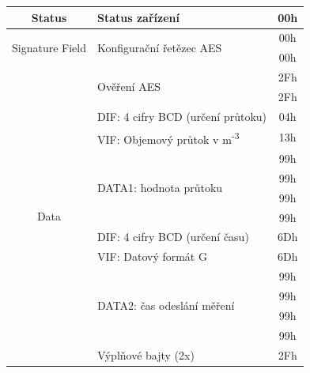 \begin{table}[!ht]
{\begin{tabular}{|c|l|c|}
Status             & Status zařízení                                & 00h              \\ \hline
\multirow{2}{*}{Signature Field} & \multirow{2}{*}{Konfigurační řetězec AES} & 00h              \\ \cline{3-3}
									&                        													& 00h              \\ \hline
\multirow{15}{*}{Data} 						   & \multirow{2}{*}{Ověření AES}                  & 2Fh              \\ \cline{3-3}
						   &                                     						& 2Fh              \\ \cline{2-3}
               & DIF: 4 cifry BCD (určení průtoku)      & 04h              \\ \cline{2-3}
               & VIF: Objemový průtok v m\textsuperscript{-3} & 13h         \\ \cline{2-3}
              & \multirow{4}{*}{DATA1: hodnota průtoku}            & 99h               \\ \cline{3-3}
               &                               											& 99h               \\  \cline{3-3}
               &                               											& 99h               \\   \cline{3-3}
              &                               											& 99h               \\ \cline{2-3}
               & DIF: 4 cifry BCD (určení času)         & 6Dh              \\ \cline{2-3}
               & VIF: Datový formát G                               & 6Dh              \\ \cline{2-3}
               & \multirow{4}{*}{DATA2: čas odeslání měření}   & 99h               \\  \cline{3-3}
              &                           												& 99h               \\  \cline{3-3}
               &                           												& 99h               \\  \cline{3-3}
               &                            											& 99h               \\ \cline{2-3}
						   & Výplňové bajty (2x)                                  & 2Fh              \\  \hline \hline
\end{tabular}}
\end{table}

\newpage{}

